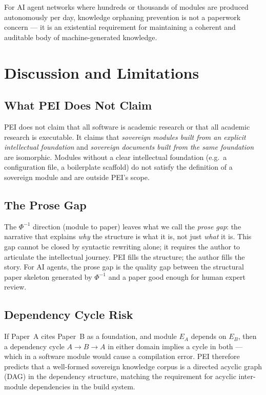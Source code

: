 \documentclass[12pt]{article}
\begin{document}
For AI agent networks where hundreds or thousands of modules are produced
autonomously per day, knowledge orphaning prevention is not a paperwork concern
— it is an existential requirement for maintaining a coherent and auditable
body of machine-generated knowledge.

\section{Discussion and Limitations}
\label{sec:discussion}

\subsection{What PEI Does Not Claim}

PEI does not claim that all software is academic research or that all academic
research is executable.  It claims that \emph{sovereign modules built from an
explicit intellectual foundation} and \emph{sovereign documents built from the
same foundation} are isomorphic.  Modules without a clear intellectual
foundation (e.g.\ a configuration file, a boilerplate scaffold) do not satisfy
the definition of a sovereign module and are outside PEI's scope.

\subsection{The Prose Gap}

The $\Phi^{-1}$ direction (module to paper) leaves what we call the
\emph{prose gap}: the narrative that explains \emph{why} the structure is what
it is, not just \emph{what} it is.  This gap cannot be closed by syntactic
rewriting alone; it requires the author to articulate the intellectual journey.
PEI fills the structure; the author fills the story.  For AI agents, the prose
gap is the quality gap between the structural paper skeleton generated by
$\Phi^{-1}$ and a paper good enough for human expert review.

\subsection{Dependency Cycle Risk}

If Paper~A cites Paper~B as a foundation, and module $E_A$ depends on $E_B$,
then a dependency cycle $A \to B \to A$ in either domain implies a cycle in
both — which in a software module would cause a compilation error.  PEI
therefore predicts that a well-formed sovereign knowledge corpus is a
directed acyclic graph (DAG) in the dependency structure, matching the
requirement for acyclic inter-module dependencies in the build system.
\end{document}
